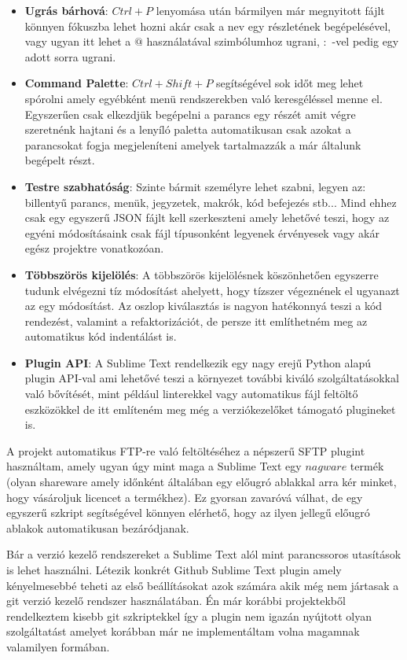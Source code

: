\documentclass[12pt]{report}
\theoremstyle{definition}
\begin{document}
	\begin{itemize}
		\item \textbf{Ugrás bárhová}: $Ctrl+P$ lenyomása után bármilyen már megnyitott fájlt könnyen fókuszba lehet hozni akár csak a nev egy részletének begépelésével, vagy ugyan itt lehet a $@$ használatával szimbólumhoz ugrani, $:$ -vel pedig egy adott sorra ugrani.
		\item \textbf{Command Palette}: $Ctrl+Shift+P$ segítségével sok időt meg lehet spórolni amely egyébként menü rendszerekben való keresgéléssel menne el. Egyszerűen csak elkezdjük begépelni a parancs egy részét amit végre szeretnénk hajtani és a lenyíló paletta automatikusan csak azokat a parancsokat fogja megjeleníteni amelyek tartalmazzák a már általunk begépelt részt.
		\item \textbf{Testre szabhatóság}: Szinte bármit személyre lehet szabni, legyen az: billentyű parancs, menük, jegyzetek, makrók, kód befejezés stb... Mind ehhez csak egy egyszerű JSON fájlt kell szerkeszteni amely lehetővé teszi, hogy az egyéni módosításaink csak fájl típusonként legyenek érvényesek vagy akár egész projektre vonatkozóan.
		\item \textbf{Többszörös kijelölés}: A többszörös kijelölésnek köszönhetően egyszerre tudunk elvégezni tíz módosítást ahelyett, hogy tízszer végeznének el ugyanazt az egy módosítást. Az oszlop kiválasztás is nagyon hatékonnyá teszi a kód rendezést, valamint a refaktorizációt, de persze itt említhetném meg az automatikus kód indentálást is.
		\item \textbf{Plugin API}: A Sublime Text rendelkezik egy nagy erejű Python alapú plugin API-val ami lehetővé teszi a környezet további kiváló szolgáltatásokkal való bővítését, mint például linterekkel vagy automatikus fájl feltöltő eszközökkel de itt említeném meg még a verziókezelőket támogató plugineket is.
	\end{itemize}
	
	A projekt automatikus FTP-re való feltöltéséhez a népszerű SFTP plugint használtam, amely ugyan úgy mint maga a Sublime Text egy $nagware$ termék (olyan shareware amely időnként általában egy előugró ablakkal arra kér minket, hogy vásároljuk licencet a termékhez). Ez gyorsan zavaróvá válhat, de egy egyszerű szkript segítségével könnyen elérhető, hogy az ilyen jellegű előugró ablakok automatikusan bezáródjanak.
	
	Bár a verzió kezelő rendszereket a Sublime Text alól mint parancssoros utasítások is lehet használni. Létezik konkrét Github Sublime Text plugin amely kényelmesebbé teheti az első beállításokat azok számára akik még nem jártasak a git verzió kezelő rendszer használatában. Én már korábbi projektekből rendelkeztem kisebb git szkriptekkel így a plugin nem igazán nyújtott olyan szolgáltatást amelyet korábban már ne implementáltam volna magamnak valamilyen formában.
	
\end{document}
